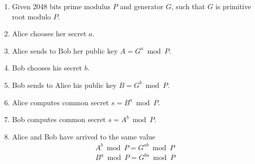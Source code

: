 \begin{enumerate}
    \item Given 2048 bits prime modulus $P$ and generator $G$, such that $G$ is primitive root modulo $P$.
    \item Alice chooses her secret $a$.
    \item Alice sends to Bob her public key $A = G^a \bmod P$.
    \item Bob chooses his secret $b$.
    \item Bob sends to Alice his public key $B = G^b \bmod P$.
    \item Alice computes common secret $s = B^a \bmod P$.
    \item Bob computes common secret $s = A^b \bmod P$.
    \item Alice and Bob have arrived to the same value
    \begin{eqnarray*}
        A^b \bmod P = G^{ab} \bmod P \\
        B^a \bmod P = G^{ba} \bmod P
    \end{eqnarray*}
\end{enumerate}

